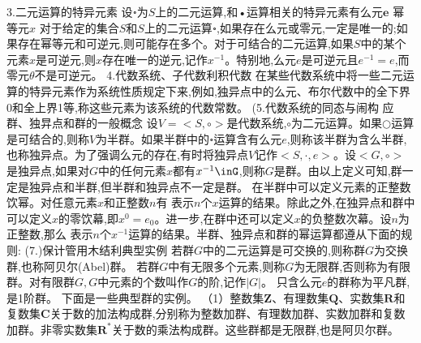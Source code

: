 {3.二元运算的特异元素}
设॰为$S$上的二元运算,和•运算相关的特异元素有么元$\boldsymbol{e}$
幂等元$x$
对于给定的集合$S$和$S$上的二元运算॰,如果存在么元或零元,一定是唯一的;如果存在幂等元和可逆元,则可能存在多个。对于可结合的二元运算,如果$S$中的某个元素$x$是可逆元,则$x$存在唯一的逆元,记作$x^{-1}$。特别地,么元$e$是可逆元且$e^{-1}=e$,而零元$\theta$不是可逆元。
{4.代数系统、子代数利积代数}
在某些代数系统中将一些二元运算的特异元素作为系统性质规定下来,例如,独异点中的么元、布尔代数中的全下界0和全上界1等,称这些元素为该系统的代数常数。
(5.代数系统的同态与闹构
应群、独㫒点和群的一般概念
设$V=<S,\circ>$是代数系统,$\circ$为二元运算。如果$○$运算是可结合的,则称$V$为半群。如果半群中的॰运算含有么元$e$,则称该半群为含么半群,也称独异点。为了强调么元的存在,有时将独异点$V$记作$<S,\cdot,e>$。设$<G,\circ>$是独异点,如果对$G$中的任何元素$x$都有$x^{-1}\inG$,则称$G$是群。由以上定义可知,群一定是独异点和半群,但半群和独异点不一定是群。
在半群中可以定义元素的正整数饮幂。对任意元素$x$和正整数$n$有
表示$n$个$x$运算的结果。除此之外,在独异点和群中可以定义$x$的零饮幕,即$x^{0}=e_{0}$。进一步,在群中还可以定义$x$的负整数次幕。设$n$为正整数,那么
表示$n$个$x^{-1}$运算的结果。半群、独异点和群的幂运算都遵从下面的规则:
{(7.)保计管用木结利典型实例}
若群$G$中的二元运算是可交换的,则称群$G$为交换群,也称阿贝尔(Abel)群。
若群$G$中有无限多个元素,则称$G$为无限群,否则称为有限群。对有限群$G,G$中元素的个数叫作$G$的阶,记作$|G|$。
只含么元$e$的群称为平凡群,是1阶群。
下面是一些典型群的实例。
（1）整数集$\mathbf{Z}$、有理数集$\mathbf{Q}$、实数集$\mathbf{R}$和复数集$\mathbf{C}$关于数的加法构成群,分别称为整数加群、有理数加群、实数加群和复数加群。非零实数集$\mathbf{R}^{*}$关于数的乘法构成群。这些群都是无限群,也是阿贝尔群。
